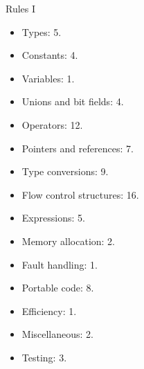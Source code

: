 \begin{frame}[t,shrink]{Rules I}
\begin{itemize}
  \item Types: 5.
  \item Constants: 4.
  \item Variables: 1.
  \item Unions and bit fields: 4.
  \item Operators: 12.
  \item Pointers and references: 7.
  \item Type conversions: 9.
  \item Flow control structures: 16.
  \item Expressions: 5.
  \item Memory allocation: 2.
  \item Fault handling: 1.
  \item Portable code: 8.
  \item Efficiency: 1.
  \item Miscellaneous: 2.
  \item Testing: 3.
\end{itemize}
\end{frame}
